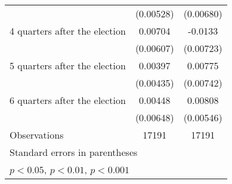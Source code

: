 \begin{table}[htbp]
\begin{tabular}{l*{2}{c}}
                    &   (0.00528)         &   (0.00680)         \\
[1em]
 4 quarters after the election&     0.00704         &     -0.0133         \\
                    &   (0.00607)         &   (0.00723)         \\
[1em]
 5 quarters after the election&     0.00397         &     0.00775         \\
                    &   (0.00435)         &   (0.00742)         \\
[1em]
 6 quarters after the election&     0.00448         &     0.00808         \\
                    &   (0.00648)         &   (0.00546)         \\
\hline
Observations        &       17191         &       17191         \\
\hline\hline
\multicolumn{3}{l}{\footnotesize Standard errors in parentheses}\\
\multicolumn{3}{l}{\footnotesize \sym{*} \(p<0.05\), \sym{**} \(p<0.01\), \sym{***} \(p<0.001\)}\\
\end{tabular}
\end{table}
